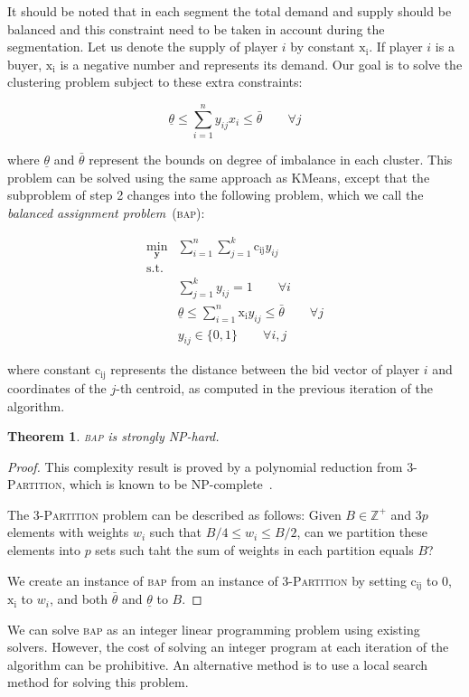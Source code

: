 \documentclass{scrartcl}
\newtheorem{theorem}{Theorem}
\begin{document}
\begin{multicols*}{2}
It should be noted that in each segment the total
demand and supply should be balanced and this constraint
need to be taken in account during the segmentation. Let us denote the supply of player $i$ by constant $\mathrm{x_i}$. If player $i$ is a buyer, $\mathrm{x_i}$ is a negative number and represents its demand. Our goal is to solve the clustering problem subject to these extra constraints:

\begin{equation}
	\underline{\theta} \leq \sum_{i=1}^{n} y_{ij} x_i \leq \bar{\theta} \qquad \forall j 
\end{equation}

where $\underline{\theta}$ and $\bar{\theta}$ represent the bounds on degree of imbalance in each cluster. This problem can be solved using the same approach as KMeans, except that the subproblem of step 2 changes into the following problem, which we call the \emph{balanced assignment problem}~(\textsc{bap}):

\begin{align*}
\min_{\mathbf{y}} & \sum_{i=1}^{n} \sum_{j=1}^{k} \mathrm{c_{ij}} y_{ij}  \\
\text{s.t.} & \\
& \sum_{j=1}^k y_{ij} = 1 \qquad \forall i \\
& \underline{\theta} \leq \sum_{i=1}^{n}  \mathrm{x_i} y_{ij} \leq \bar{\theta} \qquad \forall j \\
& y_{ij} \in \{0, 1\} \qquad \forall i, j
\end{align*}

where constant $\mathrm{c_{ij}}$ represents the distance between the bid vector of player $i$ and coordinates of the $j$-th centroid, as computed in the previous iteration of the algorithm.

\begin{theorem}
	\textsc{bap} is strongly NP-hard.
\end{theorem}
\begin{proof}
	This complexity result is proved by a polynomial reduction from \textsc{3-Partition}, which is known to be NP-complete~\cite{GareyJ79}. 
	
	The \textsc{3-Partition} problem can be described as follows:
	Given $B \in \mathbb{Z}^+$ and $3p$ elements with weights $w_i$ such that $B/4 \leq w_i \leq B/2$, can we partition these elements into $p$ sets such taht the sum of weights in each partition equals $B$? 

	
	We create an instance of \textsc{bap} from an instance of \textsc{3-Partition} by setting $\mathrm{c_{ij}}$ to 0, $\mathrm{x_i}$ to $w_i$, and both $\bar{\theta}$ and $\underline{\theta}$ to $B$. 
\end{proof}

We can solve \textsc{bap} as an integer linear programming problem using existing solvers. However, the cost of solving an integer program at each iteration of the algorithm can be prohibitive. An alternative method is to use a local search method for solving this problem.  
 



\end{multicols*}
\end{document}
